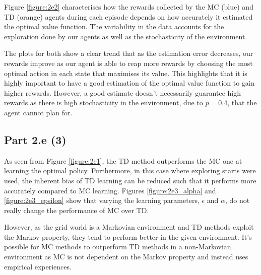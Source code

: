 \documentclass[12pt]{article}
\begin{document}
Figure \ref{figure:2e2} characterises how the rewards collected by the MC (blue) and TD (orange) agents during each episode depends on how accurately it estimated the optimal value function. The variability in the data accounts for the exploration done by our agents as well as the stochasticity of the environment.\medskip

The plots for both show a clear trend that as the estimation error decreases, our rewards improve as our agent is able to reap more rewards by choosing the most optimal action in each state that maximises its value. This highlights that it is highly important to have a good estimation of the optimal value function to gain higher rewards. However, a good estimate doesn't necessarily guarantee high rewards as there is high stochasticity in the environment, due to \(p = 0.4\), that the agent cannot plan for.

\subsection*{Part 2.e (3)}

As seen from Figure \ref{figure:2e1}, the TD method outperforms the MC one at learning the optimal policy. Furthermore, in this case where exploring starts were used, the inherent bias of TD learning can be reduced such that it performs more accurately compared to MC learning. Figures \ref{figure:2e3_alpha} and \ref{figure:2e3_epsilon} show that varying the learning parameters, \(\epsilon\) and \(\alpha\), do not really change the performance of MC over TD.\medskip

However, as the grid world is a Markovian environment and TD methods exploit the Markov property, they tend to perform better in the given environment. It's possible for MC methods to outperform TD methods in a non-Markovian environment as MC is not dependent on the Markov property and instead uses empirical experiences.\medskip
\end{document}
